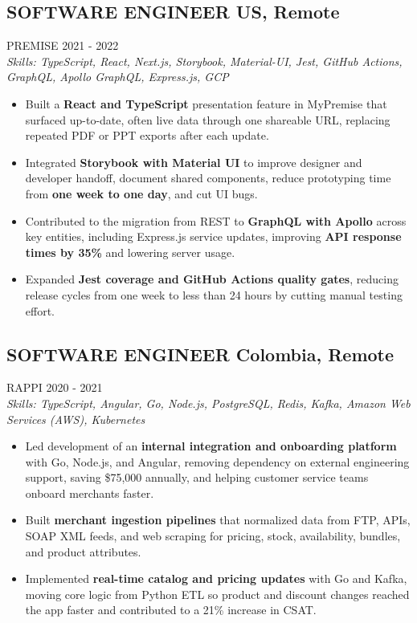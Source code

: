 \documentclass{article}
\newcommand{\WorkExperience}[2]{
   \subsection*{#1}
   \vspace{-1em}
   \uppercase{#2}
}
\newcommand{\Skills}[1]{
   \textit{Skills: #1}
}
\begin{document}
\WorkExperience{SOFTWARE ENGINEER \hfill US, Remote}{Premise \hfill 2021 {-} 2022} \\
\Skills{TypeScript, React, Next.js, Storybook, Material-UI, Jest, GitHub Actions, GraphQL, Apollo GraphQL, Express.js, GCP}
\begin{itemize}
	\item Built a \textbf{React and TypeScript} presentation feature in MyPremise that surfaced up-to-date, often live data through one shareable URL, replacing repeated PDF or PPT exports after each update.
	\item Integrated \textbf{Storybook with Material UI} to improve designer and developer handoff, document shared components, reduce prototyping time from \textbf{one week to one day}, and cut UI bugs.
	\item Contributed to the migration from REST to \textbf{GraphQL with Apollo} across key entities, including Express.js service updates, improving \textbf{API response times by 35\%} and lowering server usage.
	\item Expanded \textbf{Jest coverage and GitHub Actions quality gates}, reducing release cycles from one week to less than 24 hours by cutting manual testing effort.
\end{itemize}

\WorkExperience{SOFTWARE ENGINEER \hfill Colombia, Remote}{Rappi \hfill 2020 {-} 2021} \\
\Skills{TypeScript, Angular, Go, Node.js, PostgreSQL, Redis, Kafka, Amazon Web Services (AWS), Kubernetes}
\begin{itemize}
	\item Led development of an \textbf{internal integration and onboarding platform} with Go, Node.js, and Angular, removing dependency on external engineering support, saving \$75,000 annually, and helping customer service teams onboard merchants faster.
	\item Built \textbf{merchant ingestion pipelines} that normalized data from FTP, APIs, SOAP XML feeds, and web scraping for pricing, stock, availability, bundles, and product attributes.
	\item Implemented \textbf{real-time catalog and pricing updates} with Go and Kafka, moving core logic from Python ETL so product and discount changes reached the app faster and contributed to a 21\% increase in CSAT.
\end{itemize}
\end{document}
